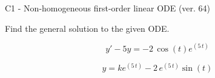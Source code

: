 \begin{exercise}
  \begin{exerciseTitle}C1 - Non-homogeneous first-order linear ODE (ver. 64)\end{exerciseTitle}
  \begin{exerciseStatement}
    
Find the general solution to the given ODE.

    
\[y'-5y= -2 \, \cos\left(t\right) e^{\left(5 \, t\right)}\]

  \end{exerciseStatement}
  \begin{exerciseAnswer}
    
\[y= k e^{\left(5 \, t\right)} - 2 \, e^{\left(5 \, t\right)} \sin\left(t\right)\]

  \end{exerciseAnswer}
\end{exercise}